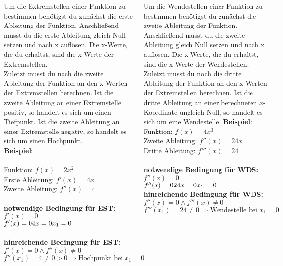 \documentclass[25pt, a3paper, portrait]{tikzposter}
\begin{document}
\begin{columns}
    {
        Um die Extremstellen einer Funktion zu bestimmen benötigst du zunächst die erste Ableitung der Funktion.
        Anschließend musst du die erste Ableitung gleich Null setzen und nach x auflösen.
        Die x-Werte, die du erhältst, sind die x-Werte der Extremstellen. \\
        Zuletzt musst du noch die zweite Ableitung der Funktion an den x-Werten der Extremstellen berechnen.
        Ist die zweite Ableitung an einer Extremstelle positiv, so handelt es sich um einen Tiefpunkt.
        Ist die zweite Ableitung an einer Extremstelle negativ, so handelt es sich um einen Hochpunkt. \\
        \textbf{Beispiel}: \\\\
        Funktion: $f(x) = 2x^2$\\
        Erste Ableitung: $f'(x) = 4x$\\
        Zweite Ableitung: $f''(x) = 4$\\\\
        \textbf{notwendige Bedingung für EST: $f'(x) = 0$}\\
        $
            f'(x) = 0 \\
            4x = 0 \\
            x_1 = 0
        $
        \\\\
        \textbf{hinreichende Bedingung für EST: $f'(x) = 0 \land f''(x) \ne 0$}\\
        $
            f''(x_1) = 4 \ne 0 > 0 \Rightarrow \text{Hochpunkt bei } x_1 = 0
        $
    }

    {
        Um die Wendestellen einer Funktion zu bestimmen benötigst du zunächst die zweite Ableitung der Funktion.
        Anschließend musst du die zweite Ableitung gleich Null setzen und nach x auflösen.
        Die x-Werte, die du erhältst, sind die x-Werte der Wendestellen. \\
        Zuletzt musst du noch die dritte Ableitung der Funktion an den x-Werten der Extremstellen berechnen.
        Ist die dritte Ableitung an einer berechneten $x$-Koordinate ungleich Null, so handelt es sich um eine Wendestelle.
        \textbf{Beispiel}: \\
        Funktion: $f(x) = 4x^3$\\
        Zweite Ableitung: $f''(x) = 24x$\\
        Dritte Ableitung: $f'''(x) = 24$\\\\
        \textbf{notwendige Bedingung für WDS: $f''(x) = 0$}\\
        $
            f''(x) = 0 \\
            24x = 0 \\
            x_1 = 0
        $
        \\
        \textbf{hinreichende Bedingung für WDS: $f''(x) = 0 \land f'''(x) \ne 0$}\\
        $
            f'''(x_1) = 24 \ne 0 \Rightarrow \text{Wendestelle bei } x_1 = 0
        $
    }
\end{columns}
\end{document}
